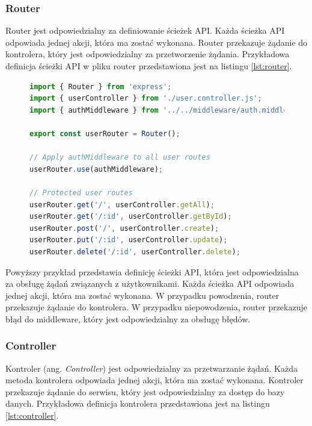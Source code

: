 
\subsubsection{Router}
Router jest odpowiedzialny za definiowanie ścieżek API. Każda ścieżka API odpowiada jednej akcji, która ma zostać wykonana. Router przekazuje żądanie do kontrolera, który jest odpowiedzialny za przetworzenie żądania. Przykładowa definicja ścieżki API w pliku router przedstawiona jest na listingu \ref{lst:router}.

\begin{figure}[H]   
\begin{lstlisting}[language=JavaScript, caption=Przykładowa definicja ścieżki API, label=lst:router]
import { Router } from 'express';
import { userController } from './user.controller.js';
import { authMiddleware } from '../../middleware/auth.middleware.js';

export const userRouter = Router();

// Apply authMiddleware to all user routes
userRouter.use(authMiddleware);

// Protected user routes
userRouter.get('/', userController.getAll);
userRouter.get('/:id', userController.getById);
userRouter.post('/', userController.create);
userRouter.put('/:id', userController.update);
userRouter.delete('/:id', userController.delete);
\end{lstlisting}
\end{figure}

Powyższy przykład przedstawia definicję ścieżki API, która jest odpowiedzialna za obsługę żądań związanych z użytkownikami. Każda ścieżka API odpowiada jednej akcji, która ma zostać wykonana. W przypadku powodzenia, router przekazuje żądanie do kontrolera. W przypadku niepowodzenia, router przekazuje błąd do middleware, który jest odpowiedzialny za obsługę błędów.

\subsubsection{Controller}
Kontroler (ang. \textit{Controller}) jest odpowiedzialny za przetwarzanie żądań. Każda metoda kontrolera odpowiada jednej akcji, która ma zostać wykonana. Kontroler przekazuje żądanie do serwisu, który jest odpowiedzialny za dostęp do bazy danych. Przykładowa definicja kontrolera przedstawiona jest na listingu \ref{lst:controller}.


